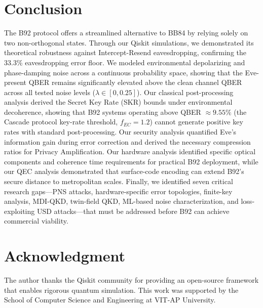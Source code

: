 \documentclass[conference]{IEEEtran}
\begin{document}
\section{Conclusion}\label{sec:conclusion}
The B92 protocol offers a streamlined alternative to BB84 by relying solely on two non-orthogonal states. Through our Qiskit simulations, we demonstrated its theoretical robustness against Intercept-Resend eavesdropping, confirming the 33.3\% eavesdropping error floor. We modeled environmental depolarizing and phase-damping noise across a continuous probability space, showing that the Eve-present QBER remains significantly elevated above the clean channel QBER across all tested noise levels ($\lambda \in [0, 0.25]$). Our classical post-processing analysis derived the Secret Key Rate (SKR) bounds under environmental decoherence, showing that B92 systems operating above QBER $\approx 9.55\%$ (the Cascade protocol key-rate threshold, $f_{EC}=1.2$) cannot generate positive key rates with standard post-processing. Our security analysis quantified Eve's information gain during error correction and derived the necessary compression ratios for Privacy Amplification. Our hardware analysis identified specific optical components and coherence time requirements for practical B92 deployment, while our QEC analysis demonstrated that surface-code encoding can extend B92's secure distance to metropolitan scales. Finally, we identified seven critical research gaps—PNS attacks, hardware-specific error topologies, finite-key analysis, MDI-QKD, twin-field QKD, ML-based noise characterization, and loss-exploiting USD attacks—that must be addressed before B92 can achieve commercial viability. %

\section*{Acknowledgment}
The author thanks the Qiskit community for providing an open-source framework that enables rigorous quantum simulation. This work was supported by the School of Computer Science and Engineering at VIT-AP University.



\end{document}
